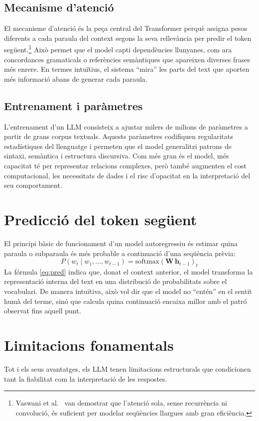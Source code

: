 \documentclass[12pt,a4paper]{report}
\begin{document}
\subsection{Mecanisme d'atenció}
El mecanisme d'atenció és la peça central del Transformer perquè assigna pesos diferents a cada paraula del context segons la seva rellevància per predir el token següent.\footnote{Vaswani et al.\ \cite{vaswani2017} van demostrar que l'atenció sola, sense recurrència ni convolució, és suficient per modelar seqüències llargues amb gran eficiència.} Això permet que el model capti dependències llunyanes, com ara concordances gramaticals o referències semàntiques que apareixen diverses frases més enrere. En termes intuïtius, el sistema ``mira'' les parts del text que aporten més informació abans de generar cada paraula.

\subsection{Entrenament i paràmetres}
L'entrenament d'un LLM consisteix a ajustar milers de milions de paràmetres a partir de grans corpus textuals. Aquests paràmetres codifiquen regularitats estadístiques del llenguatge i permeten que el model generalitzi patrons de sintaxi, semàntica i estructura discursiva. Com més gran és el model, més capacitat té per representar relacions complexes, però també augmenten el cost computacional, les necessitats de dades i el risc d'opacitat en la interpretació del seu comportament.

\section{Predicció del token següent}
El principi bàsic de funcionament d'un model autoregressiu és estimar quina paraula o subparaula és més probable a continuació d'una seqüència prèvia:
\begin{equation}\label{eq:pred}
P(w_t \mid w_1, \ldots, w_{t-1}) = \mathrm{softmax}(\mathbf{W}\,\mathbf{h}_{t-1})_t
\end{equation}
La fórmula \ref{eq:pred} indica que, donat el context anterior, el model transforma la representació interna del text en una distribució de probabilitats sobre el vocabulari. De manera intuïtiva, això vol dir que el model no ``entén'' en el sentit humà del terme, sinó que calcula quina continuació encaixa millor amb el patró observat fins aquell punt.

\section{Limitacions fonamentals}
Tot i els seus avantatges, els LLM tenen limitacions estructurals que condicionen tant la fiabilitat com la interpretació de les respostes.
\end{document}
